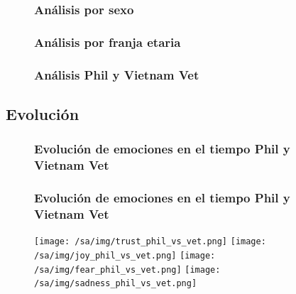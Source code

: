 \documentclass{beamer}
\begin{document}
\begin{frame}
\begin{figure}[h]
\frametitle{Análisis por sexo}
\end{figure}
\end{frame}


\begin{frame}
\begin{figure}[h]
\frametitle{Análisis por franja etaria}
\end{figure}
\end{frame}


\begin{frame}
\begin{figure}[h]
\frametitle{Análisis Phil y Vietnam Vet}
\end{figure}
\end{frame}

\subsection{Evolución}

\begin{frame}
\begin{figure}[h]
\frametitle{Evolución de emociones en el tiempo Phil y Vietnam Vet}
\end{figure}
\end{frame}

\begin{frame}
\begin{figure}[h]
\frametitle{Evolución de emociones en el tiempo Phil y Vietnam Vet}
\begin{center}
\texttt{[image: /sa/img/trust\_phil\_vs\_vet.png]}
\texttt{[image: /sa/img/joy\_phil\_vs\_vet.png]}
\texttt{[image: /sa/img/fear\_phil\_vs\_vet.png]}
\texttt{[image: /sa/img/sadness\_phil\_vs\_vet.png]}
\end{center}
\end{figure}
\end{frame}
\end{document}
